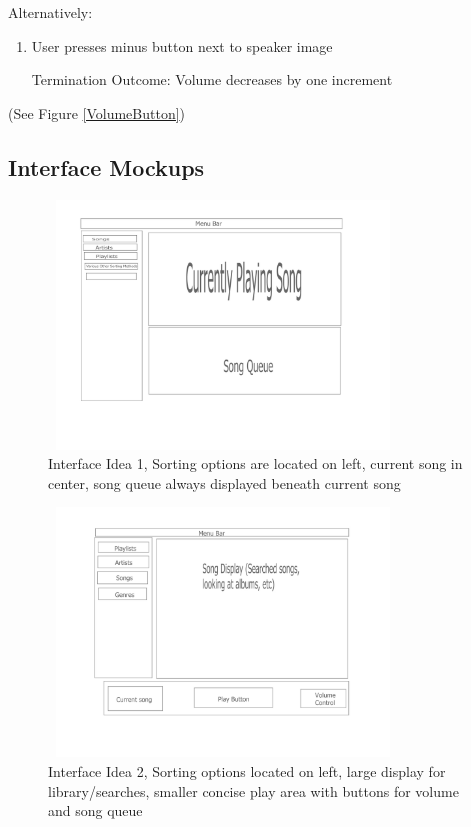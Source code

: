 \documentclass[10pt,conference,onecolumn,compsoc]{IEEEtran}
\begin{document}
Alternatively:
\begin{enumerate}
\item User presses minus button next to speaker image
\item [Termination Outcome:] Volume decreases by one increment
\end{enumerate}

(See Figure \ref{VolumeButton})

\subsection{Interface Mockups}

\begin{figure}[ht!]
\includegraphics[height=250px, width=350px]{Interface_Mock_Up_1.jpg}
\caption{Interface Idea 1, Sorting options are located on left, current song in center, song queue always displayed beneath current song}
\label{Interface1}
\end{figure}

\begin{figure}
\includegraphics[height=250px, width=350px]{Interface_Mock_Up_2.jpg}
\caption{Interface Idea 2, Sorting options located on left, large display for library/searches, smaller concise play area with buttons for volume and song queue}
\label{Interface2}
\end{figure}
\end{document}
